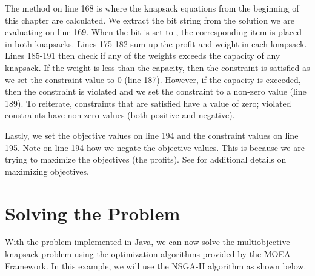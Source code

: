 The  method on line 168 is where the knapsack equations from the beginning of this chapter are calculated.  We extract the bit string from the solution we are evaluating on line 169.  When the bit is set to , the corresponding item is placed in both knapsacks.  Lines 175-182 sum up the profit and weight in each knapsack.  Lines 185-191 then check if any of the weights exceeds the capacity of any knapsack.  If the weight is less than the capacity, then the constraint is satisfied as we set the constraint value to 0 (line 187).  However, if the capacity is exceeded, then the constraint is violated and we set the constraint to a non-zero value (line 189).  To reiterate, constraints that are satisfied have a value of zero; violated constraints have non-zero values (both positive and negative).

Lastly, we set the objective values on line 194 and the constraint values on line 195.  Note on line 194 how we negate the objective values.  This is because we are trying to maximize the objectives (the profits).  See  for additional details on maximizing objectives.

\section{Solving the Problem}
With the problem implemented in Java, we can now solve the multiobjective knapsack problem using the optimization algorithms provided by the MOEA Framework.  In this example, we will use the NSGA-II algorithm as shown below.  

